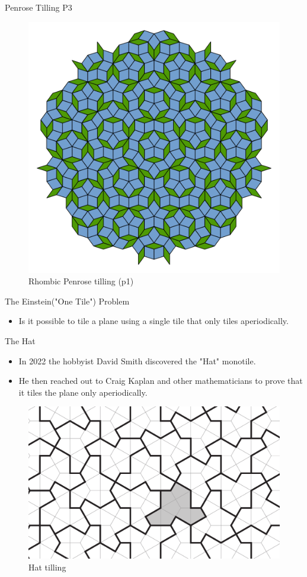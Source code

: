 \documentclass{beamer}
\begin{document}
\begin{frame}{Penrose Tilling P3}
    \begin{figure}
        \centering
        \includegraphics[width=0.6\linewidth]{images/penrose/Penrose_Tiling_(Rhombi).svg}
        \caption{Rhombic Penrose tilling (p1)\cite{penrose_tiling_rhombi}}
        \label{fig:penrose-rhombi}
    \end{figure}
\end{frame}

\begin{frame}{The Einstein("One Tile") Problem}
    \begin{itemize}
        \item Is it possible to tile a plane using a single tile that only tiles aperiodically.
    \end{itemize}
\end{frame}

\begin{frame}{The Hat}
    \begin{itemize}
        \item In 2022 the hobbyist David Smith discovered the "Hat" monotile.
        \item He then reached out to Craig Kaplan and other mathematicians to prove that it tiles the plane only aperiodically\cite{Smith_2024}.
    \end{itemize}
    
    \begin{figure}
        \centering
        \includegraphics[width=0.5\linewidth]{images/aperiodic-pdfs/polykite_tiling_raster.pdf}
        \caption{Hat tilling}
        \label{fig:hat-monotile}
    \end{figure}
\end{frame}
\end{document}
